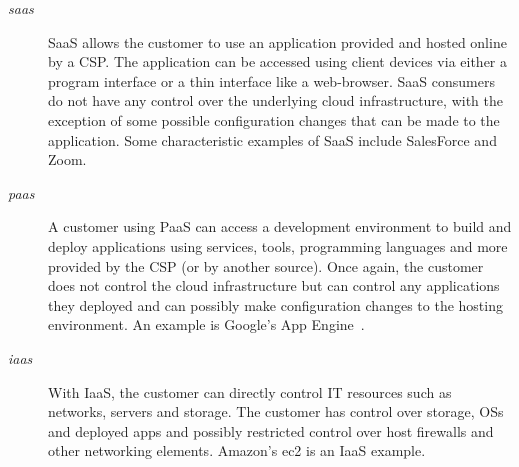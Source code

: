 \begin{description}
    \item [\textit{\ac{saas}}] SaaS allows the customer to use an application provided and hosted online by a CSP. The application can be accessed using client devices via either a program interface or a thin interface like a web-browser. SaaS consumers do not have any control over the underlying cloud infrastructure, with the exception of some possible configuration changes that can be made to the application. Some characteristic examples of SaaS include SalesForce and Zoom.~\cite{saleforce,zoom}

    \item [\textit{\ac{paas}}] A customer using PaaS can access a development environment to build and deploy applications using services, tools, programming languages and more provided by the CSP (or by another source). Once again, the customer does not control the cloud infrastructure but can control any applications they deployed and can possibly make configuration changes to the hosting environment. An example is Google's App Engine~\cite{appengine}.

    \item [\textit{\ac{iaas}}] With IaaS, the customer can directly control IT resources such as networks, servers and storage. The customer has control over storage, OSs and deployed apps and possibly restricted control over host firewalls and other networking elements. Amazon's \ac{ec2} is an IaaS example.~\cite{ec2}
\end{description}


